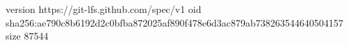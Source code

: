version https://git-lfs.github.com/spec/v1
oid sha256:ae790c8b6192d2c0bfba872025af890f478e6d3ac879ab738263544640504157
size 87544
